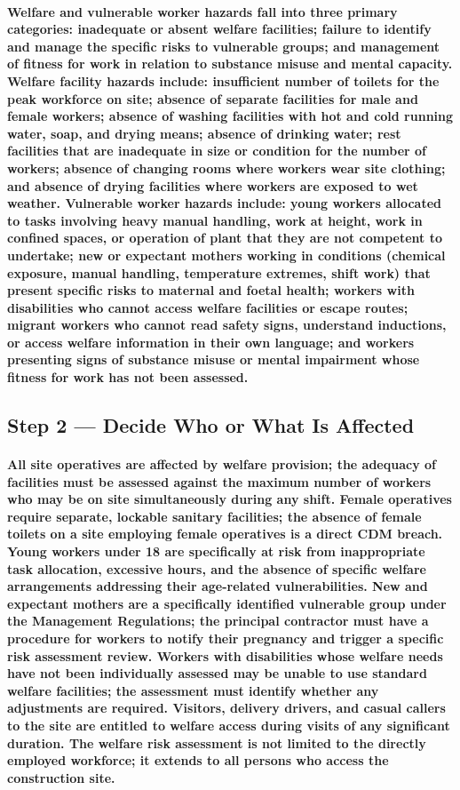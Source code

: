 \paragraph{Welfare and vulnerable worker hazards fall into three primary categories: inadequate or absent welfare facilities; failure to identify and manage the specific risks to vulnerable groups; and management of fitness for work in relation to substance misuse and mental capacity. Welfare facility hazards include: insufficient number of toilets for the peak workforce on site; absence of separate facilities for male and female workers; absence of washing facilities with hot and cold running water, soap, and drying means; absence of drinking water; rest facilities that are inadequate in size or condition for the number of workers; absence of changing rooms where workers wear site clothing; and absence of drying facilities where workers are exposed to wet weather. Vulnerable worker hazards include: young workers allocated to tasks involving heavy manual handling, work at height, work in confined spaces, or operation of plant that they are not competent to undertake; new or expectant mothers working in conditions (chemical exposure, manual handling, temperature extremes, shift work) that present specific risks to maternal and foetal health; workers with disabilities who cannot access welfare facilities or escape routes; migrant workers who cannot read safety signs, understand inductions, or access welfare information in their own language; and workers presenting signs of substance misuse or mental impairment whose fitness for work has not been assessed.}

\subsection{Step 2 --- Decide Who or What Is Affected}
\paragraph{All site operatives are affected by welfare provision; the adequacy of facilities must be assessed against the maximum number of workers who may be on site simultaneously during any shift. Female operatives require separate, lockable sanitary facilities; the absence of female toilets on a site employing female operatives is a direct CDM breach. Young workers under 18 are specifically at risk from inappropriate task allocation, excessive hours, and the absence of specific welfare arrangements addressing their age-related vulnerabilities. New and expectant mothers are a specifically identified vulnerable group under the Management Regulations; the principal contractor must have a procedure for workers to notify their pregnancy and trigger a specific risk assessment review. Workers with disabilities whose welfare needs have not been individually assessed may be unable to use standard welfare facilities; the assessment must identify whether any adjustments are required. Visitors, delivery drivers, and casual callers to the site are entitled to welfare access during visits of any significant duration. The welfare risk assessment is not limited to the directly employed workforce; it extends to all persons who access the construction site.}

